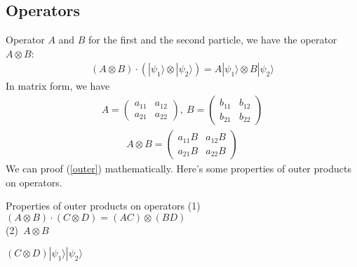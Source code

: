 \documentclass[UTF8,12pt]{article} %
\makeatletter
\newenvironment{proof}[1][\protect\proofname]{\par
\normalfont\topsep6\p@\@plus6\p@\relax
\trivlist
\itemindent\parindent
\item[\hskip\labelsep
\scshape
#1]\ignorespaces
}{%
\endtrivlist\@endpefalse
}
\renewcommand{\proofname}{\it{Solution}}
\makeatother
\begin{document}
\subsection{Operators}
Operator $A$ and $B$ for the first and the second particle, we have the operator $A\otimes B$:
\begin{align}\label{outer}
\left(A\otimes B\right)\cdot \left(|\psi_1\rangle\otimes|\psi_2\rangle\right) = A|\psi_1\rangle\otimes B|\psi_2\rangle
\end{align}
In matrix form, we have 
\begin{align}
A = \begin{pmatrix}a_{11} & a_{12}\\a_{21} & a_{22}\end{pmatrix},~ B = \begin{pmatrix}b_{11}&b_{12}\\b_{21}&b_{22}\end{pmatrix}
\end{align}
\begin{align}
A\otimes B = \begin{pmatrix}a_{11}B&a_{12}B\\a_{21}B&a_{22}B\end{pmatrix}
\end{align}
We can proof (\ref{outer}) mathematically. Here's some properties of outer products on operators.
\begin{myboxes}{Properties of outer products on operators}{}
(1)~$\left(A\otimes B\right)\cdot\left(C\otimes D\right) = (AC)\otimes (BD)$\\
(2)~$A\otimes B$
\end{myboxes}
\begin{proof}[Proof]
$(C\otimes D)|\psi_1\rangle|\psi_2\rangle$
\end{proof}
\end{document}
